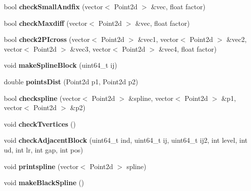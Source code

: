 \begin{DoxyCompactItemize}
\item 
\mbox{\label{class_splines_a7e5939b71ea73a97405a8dbf9b076382}} 
bool {\bfseries check\+Small\+Andfix} (vector$<$ Point2d $>$ \&vec, float factor)
\item 
\mbox{\label{class_splines_a23a521c10ad1f0ab094f1ce22c809511}} 
bool {\bfseries check\+Maxdiff} (vector$<$ Point2d $>$ \&vec, float factor)
\item 
\mbox{\label{class_splines_a5075372495e3e197de52e2fa855e0740}} 
bool {\bfseries check2\+P\+Icross} (vector$<$ Point2d $>$ \&vec1, vector$<$ Point2d $>$ \&vec2, vector$<$ Point2d $>$ \&vec3, vector$<$ Point2d $>$ \&vec4, float factor)
\item 
\mbox{\label{class_splines_a46c909a9aff151672b723e5e7236d30b}} 
void {\bfseries make\+Spline\+Block} (uint64\+\_\+t ij)
\item 
\mbox{\label{class_splines_ad75796e90f6da7be290f76c495764fa1}} 
double {\bfseries points\+Dist} (Point2d p1, Point2d p2)
\item 
\mbox{\label{class_splines_a672bcdf09fbb61e4cf2e03e7f37250b5}} 
bool {\bfseries checkspline} (vector$<$ Point2d $>$ \&spline, vector$<$ Point2d $>$ \&p1, vector$<$ Point2d $>$ \&p2)
\item 
\mbox{\label{class_splines_abfeb93c564caf26f8bc99c62afb5a8d6}} 
void {\bfseries check\+Tvertices} ()
\item 
\mbox{\label{class_splines_a36d400c2ee3fed81cdecf201e78f4455}} 
void {\bfseries check\+Adjacent\+Block} (uint64\+\_\+t ind, uint64\+\_\+t ij, uint64\+\_\+t ij2, int level, int ud, int lr, int gap, int pos)
\item 
\mbox{\label{class_splines_ac4564d182e0372519fd9f04e5770dd7f}} 
void {\bfseries printspline} (vector$<$ Point2d $>$ spline)
\item 
\mbox{\label{class_splines_a32126a536f4a65a7608d199b23a58147}} 
void {\bfseries make\+Black\+Spline} ()
\item 

\end{DoxyCompactItemize}
